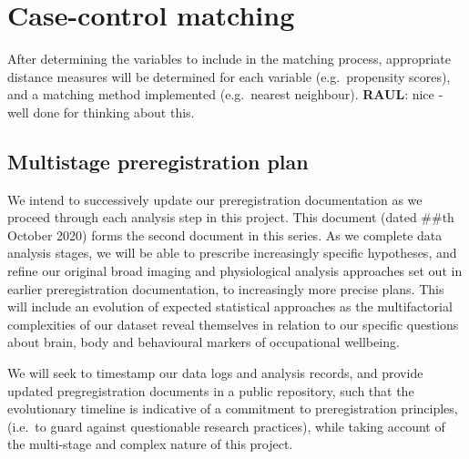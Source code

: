 \documentclass[
]{article}
\begin{document}
\hypertarget{case-control-matching}{%
\section{Case-control matching}\label{case-control-matching}}

After determining the variables to include in the matching process,
appropriate distance measures will be determined for each variable
(e.g.~propensity scores), and a matching method implemented
(e.g.~nearest neighbour). \textbf{RAUL}: nice - well done for thinking
about this.

\newpage

\hypertarget{multistage-preregistration-plan}{%
\subsection{Multistage preregistration
plan}\label{multistage-preregistration-plan}}

We intend to successively update our preregistration documentation as we
proceed through each analysis step in this project. This document (dated
\#\#th October 2020) forms the second document in this series. As we
complete data analysis stages, we will be able to prescribe increasingly
specific hypotheses, and refine our original broad imaging and
physiological analysis approaches set out in earlier preregistration
documentation, to increasingly more precise plans. This will include an
evolution of expected statistical approaches as the multifactorial
complexities of our dataset reveal themselves in relation to our
specific questions about brain, body and behavioural markers of
occupational wellbeing.

We will seek to timestamp our data logs and analysis records, and
provide updated pregregistration documents in a public repository, such
that the evolutionary timeline is indicative of a commitment to
preregistration principles, (i.e.~to guard against questionable research
practices), while taking account of the multi-stage and complex nature
of this project.

\newpage
\end{document}
